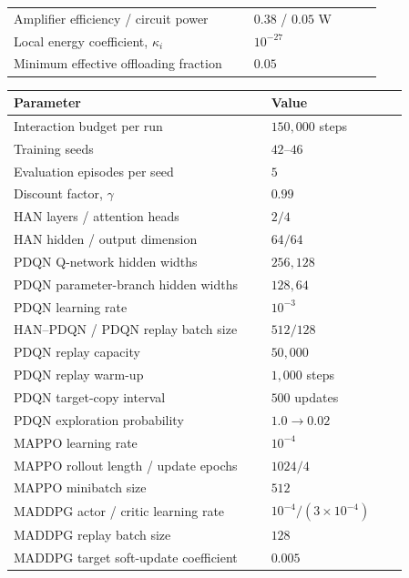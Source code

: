 \begin{strip}
\begin{minipage}[t]{0.485\textwidth}
\begin{tabular}{p{0.60\linewidth}p{0.32\linewidth}}
        Amplifier efficiency / circuit power & $0.38$ / $0.05$ W \\
        Local energy coefficient, $\kappa_i$ & $10^{-27}$ \\
        Minimum effective offloading fraction & $0.05$ \\
        \hline
    \end{tabular}
\end{minipage}\hfill%
\begin{minipage}[t]{0.485\textwidth}
\vspace{0pt}
\LEOTableSetup
{}
    \label{tab:training_parameters}
    \centering
    \footnotesize
    \renewcommand{\arraystretch}{1.08}
    \setlength{\tabcolsep}{4pt}
    \begin{tabular}{p{0.60\linewidth}p{0.32\linewidth}}
        \hline
        Parameter & Value \\
        \hline
        Interaction budget per run & $150{,}000$ steps \\
        Training seeds & $42$--$46$ \\
        Evaluation episodes per seed & $5$ \\
        Discount factor, $\gamma$ & $0.99$ \\
        HAN layers / attention heads & $2/4$ \\
        HAN hidden / output dimension & $64/64$ \\
        PDQN Q-network hidden widths & $256,128$ \\
        PDQN parameter-branch hidden widths & $128,64$ \\
        PDQN learning rate & $10^{-3}$ \\
        HAN--PDQN / PDQN replay batch size & $512/128$ \\
        PDQN replay capacity & $50{,}000$ \\
        PDQN replay warm-up & $1{,}000$ steps \\
        PDQN target-copy interval & $500$ updates \\
        PDQN exploration probability & $1.0\rightarrow0.02$ \\
        MAPPO learning rate & $10^{-4}$ \\
        MAPPO rollout length / update epochs & $1024/4$ \\
        MAPPO minibatch size & $512$ \\
        MADDPG actor / critic learning rate
        & $10^{-4}/(3\times10^{-4})$ \\
        MADDPG replay batch size & $128$ \\
        MADDPG target soft-update coefficient & $0.005$ \\
        \hline
    \end{tabular}
\end{minipage}
\end{strip}

